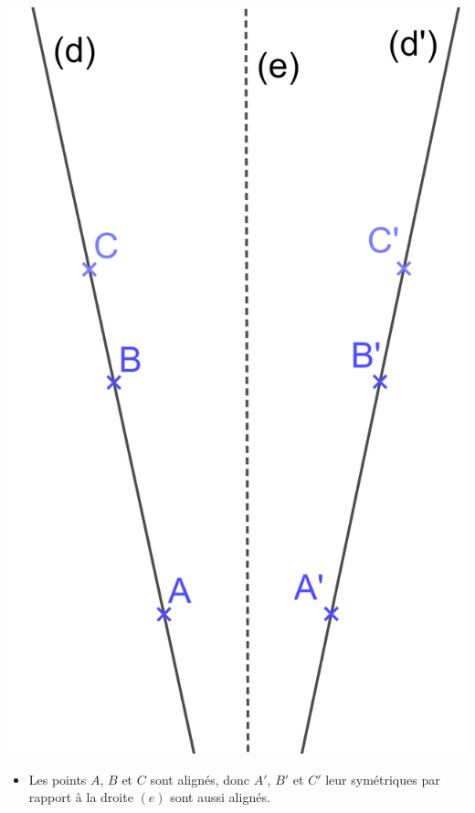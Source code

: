 \documentclass[xcolor={dvipsnames}]{beamer}
\begin{document}
\begin{frame}
	\begin{myexs}
				
			
			\begin{center}
				\includegraphics[scale=0.1]{sym_droites1}
			\end{center}
			
			\begin{itemize}
				\item Les points $A$, $B$ et $C$ sont alignés, donc \pause $A'$, $B'$ et $C'$ leur symétriques par rapport \pause à la droite $(e)$ sont \pause aussi alignés.
			\end{itemize}	
	\end{myexs}
\end{frame}
\end{document}
